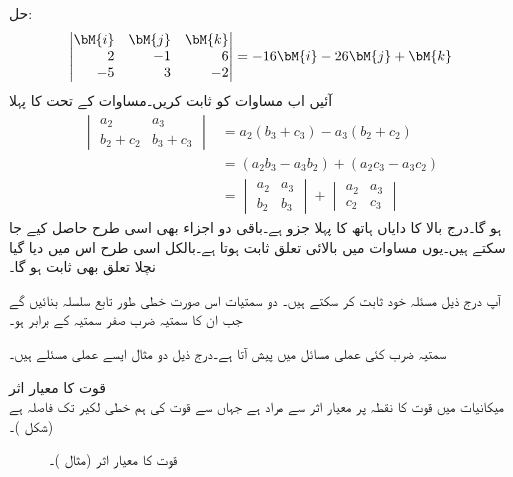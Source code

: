حل:
\begin{align*}
\begin{vmatrix*}[r]\bM{i}&\bM{j}&\bM{k}\\2&-1&6\\-5&3&-2  \end{vmatrix*}=-16\bM{i}-26\bM{j}+\bM{k}
\end{align*}
آئیں اب مساوات  کو ثابت کریں۔مساوات  کے تحت  کا پہلا
\begin{align*}
\begin{vmatrix}a_2&a_3\\b_2+c_2&b_3+c_3 \end{vmatrix}&=a_2(b_3+c_3)-a_3(b_2+c_2)\\
&=(a_2b_3-a_3b_2)+(a_2c_3-a_3c_2)\\
&=\begin{vmatrix} a_2&a_3\\b_2&b_3 \end{vmatrix}+\begin{vmatrix}a_2&a_3\\c_2&c_3  \end{vmatrix}
\end{align*}
ہو گا۔درج بالا کا دایاں ہاتھ   کا پہلا جزو ہے۔باقی دو اجزاء بھی اسی طرح حاصل کیے جا سکتے ہیں۔یوں  مساوات  میں بالائی تعلق ثابت ہوتا ہے۔بالکل اسی طرح اس میں دیا گیا نچلا تعلق بھی ثابت ہو گا۔ 

آپ درج ذیل مسئلہ خود ثابت کر سکتے ہیں۔
دو سمتیات اس صورت خطی طور تابع سلسلہ بنائیں گے جب ان کا سمتیہ ضرب صفر سمتیہ کے برابر ہو۔

سمتیہ ضرب کئی عملی مسائل میں پیش آتا ہے۔درج ذیل دو مثال ایسے عملی مسئلے ہیں۔

\quad قوت کا معیار اثر\\
میکانیات میں قوت  کا نقطہ  پر  معیار اثر  سے مراد  ہے  جہاں  سے قوت کی ہم خطی لکیر  تک   فاصلہ  ہے (شکل )۔
\begin{figure}
\centering
{}
\caption{قوت کا معیار اثر (مثال )۔}
\label{شکل_مثال_الجبرا_قوت_معیار_اثر}
\end{figure}

